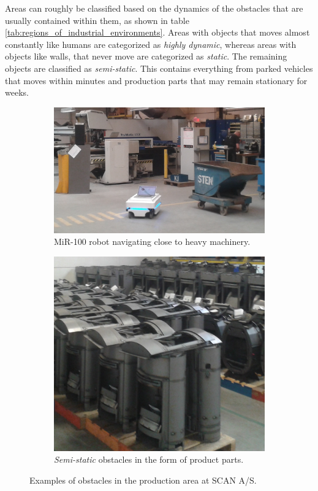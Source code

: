 Areas can roughly be classified based on the dynamics of the obstacles that are usually contained within them, as shown in table \ref{tab:regions_of_industrial_environments}. Areas with objects that moves almost constantly like humans are categorized as \textit{highly dynamic}, whereas areas with objects like walls, that never move are categorized as \textit{static}. The remaining objects are classified as \textit{semi-static}. This contains everything from parked vehicles that moves within minutes and production parts that may remain stationary for weeks. 

\begin{figure}[htbp]
	\centering
	\begin{subfigure}[t]{0.6\textwidth}
		\includegraphics[width=1.0\textwidth]{chapters/mapping_of_dynamic_areas/figures/scan-mir}	
		\caption{MiR-100 robot navigating close to heavy machinery.}
		\label{fig:scan-mir}
	\end{subfigure}
	\begin{subfigure}[t]{0.3875\textwidth}
		\includegraphics[width=1.0\textwidth]{chapters/mapping_of_dynamic_areas/figures/scan-semi-static-obstacles}
		\caption{\textit{Semi-static} obstacles in the form of product parts.}
		\label{fig:scan-semi-static-obstacles}
	\end{subfigure}
	\caption{Examples of obstacles in the production area at SCAN A/S.}
\end{figure}

